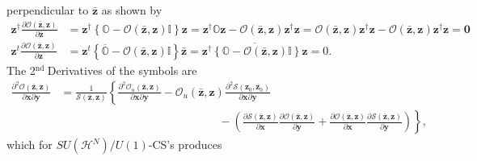\documentclass[aps,preprint]{revtex4}%
\begin{document}
perpendicular to $\mathbf{\bar{z}}$ as shown by
\begin{align}
\mathbf{z}^{\dagger}\frac{\partial\mathcal{O}\left(  \mathbf{\bar{z}%
,z}\right)  }{\partial\mathbf{\bar{z}}}  &  =\mathbf{z}^{\dagger}\left\{
\mathbb{O}-\mathcal{O}\left(  \mathbf{\bar{z},z}\right)  \mathbb{I}\right\}
\mathbf{z=z}^{\dagger}\mathbb{O}\mathbf{z-}\mathcal{O}\left(  \mathbf{\bar
{z},z}\right)  \mathbf{z}^{\dagger}\mathbf{z=}\mathcal{O}\left(
\mathbf{\bar{z},z}\right)  \mathbf{z}^{\dagger}\mathbf{z-}\mathcal{O}\left(
\mathbf{\bar{z},z}\right)  \mathbf{z}^{\dagger}\mathbf{z=0}\nonumber\\
\mathbf{z}^{t}\frac{\partial\mathcal{O}\left(  \mathbf{\bar{z},z}\right)
}{\partial\mathbf{z}}  &  =\mathbf{z}^{t}\left\{  \overline{\mathbb{O}%
}-\mathcal{O}\left(  \mathbf{\bar{z},z}\right)  \mathbb{I}\right\}
\mathbf{\bar{z}=}\overline{\mathbf{z}^{\dagger}\left\{  \mathbb{O}%
-\mathcal{O}\left(  \mathbf{\bar{z},z}\right)  \mathbb{I}\right\}  \mathbf{z}%
}=0.
\end{align}
The 2$^{\text{nd }}$Derivatives of the symbols are
\begin{align}
\frac{\partial^{2}\mathcal{O}\left(  \mathbf{\bar{z},z}\right)  }%
{\partial\mathbf{x}\partial\mathbf{y}}  &  =\frac{1}{\mathcal{S}\left(
\mathbf{\bar{z},z}\right)  }\left\{  \frac{\partial^{2}\mathcal{O}_{u}\left(
\mathbf{\bar{z},z}\right)  }{\partial\mathbf{x}\partial\mathbf{y}}%
-\mathcal{O}_{u}\left(  \mathbf{\bar{z},z}\right)  \frac{\partial
^{2}\mathcal{S}\left(  \mathbf{z}_{0},\mathbf{\bar{z}}_{0}\right)  }%
{\partial\mathbf{x}\partial\mathbf{y}}\right. \nonumber\\
&  \qquad\qquad\qquad\qquad\qquad\qquad\qquad-\left.  \left(  \frac
{\partial\mathcal{S}\left(  \mathbf{\bar{z},z}\right)  }{\partial\mathbf{x}%
}\frac{\partial\mathcal{O}\left(  \mathbf{\bar{z},z}\right)  }{\partial
\mathbf{y}}+\frac{\partial\mathcal{O}\left(  \mathbf{\bar{z},z}\right)
}{\partial\mathbf{x}}\frac{\partial\mathcal{S}\left(  \mathbf{\bar{z}%
,z}\right)  }{\partial\mathbf{y}}\right)  \right\}  ,
\end{align}
which for $SU\left(  \mathcal{H}^{N}\right)  /U\left(  1\right)  $-CS's
produces
\end{document}
